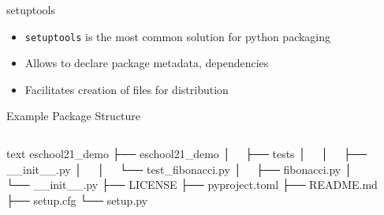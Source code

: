 \begin{frame}[c]{setuptools}
  \begin{itemize}
    \item \texttt{setuptools} is the most common solution for python packaging
    \item Allows to declare package metadata, dependencies
    \item Facilitates creation of files for distribution
  \end{itemize}
\end{frame}
\begin{frame}[c, fragile]{Example Package Structure}
  \begin{columns}[onlytextwidth, c]%
    \begin{column}{0.44\textwidth}%
      \begin{code}{text}
        eschool21_demo
        ├── eschool21_demo
        │   ├── tests
        │   │   ├── __init__.py
        │   │   └── test_fibonacci.py
        │   ├── fibonacci.py
        │   └── __init__.py
        ├── LICENSE
        ├── pyproject.toml
        ├── README.md
        ├── setup.cfg
        └── setup.py
      \end{code}
    \end{column}%
    \hfill%
    \begin{column}{0.55\textwidth}%
    \end{column}%
  \end{columns}%
\end{frame}

